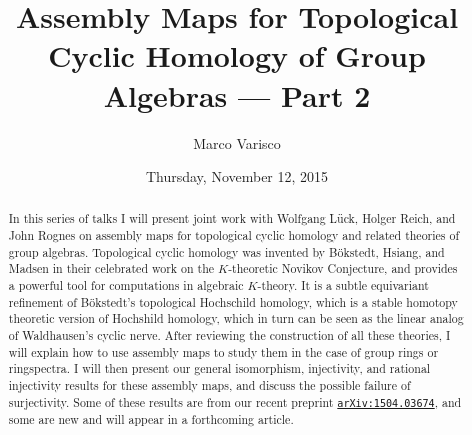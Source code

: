 \documentclass{UAmathtalk}
\author{Marco Varisco}
\title{Assembly Maps for Topological Cyclic Homology of Group Algebras --- Part 2}
\date{Thursday, November 12, 2015}
\begin{document}
\maketitle

\begin{abstract}
In this series of talks I will present joint work with Wolfgang Lück, Holger Reich, and John Rognes on assembly maps for topological cyclic homology and related theories of group algebras.
Topological cyclic homology was invented by Bökstedt, Hsiang, and Madsen in their celebrated work on the $K$-theoretic Novikov Conjecture, and provides a powerful tool for computations in algebraic $K$-theory.
It is a subtle equivariant refinement of Bökstedt's topological Hochschild homology, which is a stable homotopy theoretic version of Hochshild homology, which in turn can be seen as the linear analog of Waldhausen's cyclic nerve.
After reviewing the construction of all these theories, I will explain how to use assembly maps to study them in the case of group rings or ringspectra.
I will then present our general isomorphism, injectivity, and rational injectivity results for these assembly maps, and discuss the possible failure of surjectivity.
Some of these results are from our recent preprint \href{http://www.arxiv.org/abs/1504.03674/}{\texttt{arXiv:1504.03674}}, and some are new and will appear in a forthcoming article.
\end{abstract}
\end{document}
